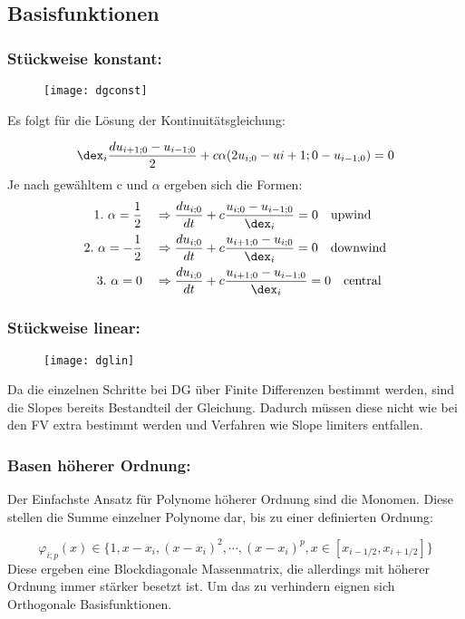 \subsection*{Basisfunktionen}
\subsubsection*{St\"uckweise konstant:}
\begin{figure*}[ht]
	\centering
	\texttt{[image: dgconst]}
\end{figure*}
Es folgt f\"ur die L\"osung der Kontinuit\"atsgleichung:
\par
\begin{equation*}
	\dex_i\frac{du_{i+1;0} - u_{i-1;0}}{2} + c\alpha(2u_{i;0} - u{i+1;0} - u_{i-1;0}) = 0
\end{equation*}
Je nach gew\"ahltem c und $\alpha$ ergeben sich die Formen:
\begin{align*}
	1.~\alpha=\frac{1}{2} ~~~&\Rightarrow\frac{du_{i;0}}{dt} + c\frac{u_{i;0} - u_{i-1;0}}{\dex_i} = 0 ~~~ \textrm{upwind} \\
	2.~\alpha = -\frac{1}{2} ~~~&\Rightarrow\frac{du_{i;0}}{dt} + c\frac{u_{i+1;0} - u_{i;0}}{\dex_i} = 0 ~~~ \textrm{downwind} \\
	3.~\alpha = 0 ~~~&\Rightarrow\frac{du_{i;0}}{dt} + c\frac{u_{i+1;0} - u_{i-1;0}}{\dex_i} = 0 ~~~ \textrm{central}
\end{align*}

\subsubsection*{St\"uckweise linear:}
\begin{figure*}[ht]
	\centering
	\texttt{[image: dglin]}
\end{figure*}
Da die einzelnen Schritte bei DG \"uber Finite Differenzen bestimmt werden, sind die Slopes bereits Bestandteil der Gleichung. Dadurch m\"ussen diese nicht wie bei den FV extra bestimmt werden und Verfahren wie Slope limiters entfallen.

\subsubsection*{Basen h\"oherer Ordnung:}
Der Einfachste Ansatz f\"ur Polynome h\"oherer Ordnung sind die Monomen. Diese stellen die Summe einzelner Polynome dar, bis zu einer definierten Ordnung:
\par
\begin{equation*}
	\varphi_{i;p}(x) \in \{ 1,x-x_i, (x-x_i)^2, \cdots, (x-x_i)^p, x\in[x_{i-1/2}, x_{i+1/2}]  \}
\end{equation*}
Diese ergeben eine Blockdiagonale Massenmatrix, die allerdings mit h\"oherer Ordnung immer st\"arker besetzt ist. Um das zu verhindern eignen sich Orthogonale Basisfunktionen.

